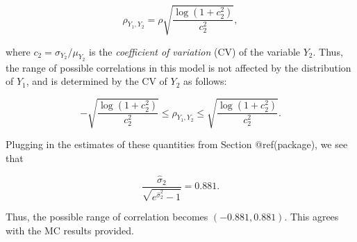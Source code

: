 \documentclass[
]{jss}
\begin{document}
\begin{equation}
\label{eq:kram9}
\rho_{Y_1, Y_2} = \rho \sqrt{\frac{\log(1+c_2^2)}{c_2^2}},
\end{equation}

where \(c_2=\sigma_{Y_2}/\mu_{Y_2}\) is the \emph{coefficient of
variation} (CV) of the variable \(Y_2\). Thus, the range of possible
correlations in this model is not affected by the distribution of
\(Y_1\), and is determined by the CV of \(Y_2\) as follows:

\begin{equation}
\label{eq:kram10}
- \sqrt{\frac{\log(1+c_2^2)}{c_2^2}} \leq \rho_{Y_1, Y_2} \leq \sqrt{\frac{\log(1+c_2^2)}{c_2^2}}. 
\end{equation}

Plugging in the estimates of these quantities from Section
@ref(package), we see that

\begin{equation}
\label{eq:kram11}
\frac{\hat{\sigma}_2}{\sqrt{e^{\hat{\sigma}_2^2} -1}} = 0.881.
\end{equation}

Thus, the possible range of correlation becomes \((-0.881, 0.881)\).
This agrees with the MC results provided.



\end{document}
